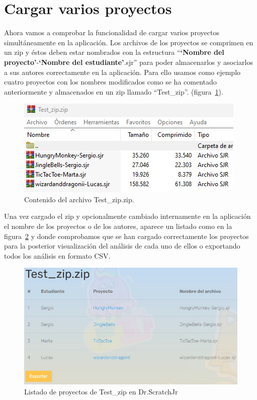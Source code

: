 \documentclass[a4paper, 12pt]{book}
\begin{document}
\section{Cargar varios proyectos}
\label{sec:Cargar zip}

Ahora vamos a comprobar la funcionalidad de cargar varios proyectos simultáneamente en la aplicación.
Los archivos de los proyectos se comprimen en un zip y éstos deben estar nombrados con la estructura ``\textbf{`Nombre del proyecto'}-\textbf{`Nombre del estudiante'}.sjr'' para poder almacenarlos y asociarlos a sus autores correctamente en la aplicación.
Para ello usamos como ejemplo cuatro proyectos con los nombres modificados como se ha comentado anteriormente y almacenados en un zip llamado ``Test\_zip''. (figura~\ref{fig:Test_zip0}). 

\begin{figure}[H]
  \centering
  \includegraphics[keepaspectratio]{img/Test_zip0.jpg}
  \caption{Contenido del archivo Test\_zip.zip.}
  \label{fig:Test_zip0}
\end{figure}

Una vez cargado el zip y opcionalmente cambiado internamente en la aplicación el nombre de los proyectos o de los autores, aparece un listado como en la figura~\ref{fig:Test_zip} y donde comprobamos que se han cargado correctamente los proyectos para la posterior visualización del análisis de cada uno de ellos o exportando todos los análisis en formato CSV.

\begin{figure}[H]
  \centering
  \includegraphics[keepaspectratio]{img/Test_zip.jpg}
  \caption{Listado de proyectos de Test\_zip en Dr.ScratchJr}
  \label{fig:Test_zip}
\end{figure}
\end{document}
